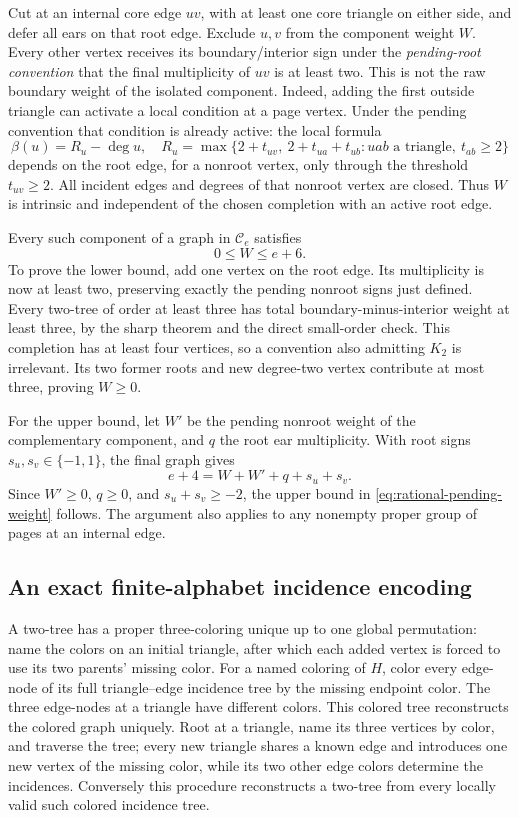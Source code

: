 Cut at an internal core edge $uv$, with at least one core triangle
on either side, and defer all ears on that root edge.  Exclude
$u,v$ from the component weight $W$.  Every other vertex receives
its boundary/interior sign under the \emph{pending-root convention}
that the final multiplicity of $uv$ is at least two.  This is not
the raw boundary weight of the isolated component.  Indeed, adding
the first outside triangle can activate a local condition at a page
vertex.  Under the pending convention that condition is already
active: the local formula
\[
 \beta(u)=R_u-\deg u,\quad
 R_u=\max\{2+t_{uv},\ 2+t_{ua}+t_{ub}:
 uab\text{ a triangle},\ t_{ab}\ge2\}
\]
depends on the root edge, for a nonroot vertex, only through the
threshold $t_{uv}\ge2$.  All incident edges and degrees of that
nonroot vertex are closed.  Thus $W$ is intrinsic and independent
of the chosen completion with an active root edge.

Every such component of a graph in $\mathcal C_e$ satisfies
\begin{equation}
 0\le W\le e+6.
 \label{eq:rational-pending-weight}
\end{equation}
To prove the lower bound, add one vertex on the root edge.  Its
multiplicity is now at least two, preserving exactly the pending
nonroot signs just defined.  Every two-tree of order at least three
has total boundary-minus-interior weight at least three, by the
sharp theorem and the direct small-order check.  This completion
has at least four vertices, so a convention also admitting $K_2$
is irrelevant.  Its two former roots and new degree-two vertex
contribute at most three, proving $W\ge0$.

For the upper bound, let $W'$ be the pending nonroot weight of the
complementary component, and $q$ the root ear multiplicity.  With
root signs $s_u,s_v\in\{-1,1\}$, the final graph gives
\[
 e+4=W+W'+q+s_u+s_v.
\]
Since $W'\ge0$, $q\ge0$, and $s_u+s_v\ge-2$, the upper bound in
\eqref{eq:rational-pending-weight} follows.  The argument also
applies to any nonempty proper group of pages at an internal edge.

\subsection{An exact finite-alphabet incidence encoding}

A two-tree has a proper three-coloring unique up to one global
permutation: name the colors on an initial triangle, after which
each added vertex is forced to use its two parents' missing color.
For a named coloring of $H$, color every edge-node of its full
triangle--edge incidence tree by the missing endpoint color.  The
three edge-nodes at a triangle have different colors.  This colored
tree reconstructs the colored graph uniquely.  Root at a triangle,
name its three vertices by color, and traverse the tree; every new
triangle shares a known edge and introduces one new vertex of the
missing color, while its two other edge colors determine the
incidences.  Conversely this procedure reconstructs a two-tree
from every locally valid such colored incidence tree.

